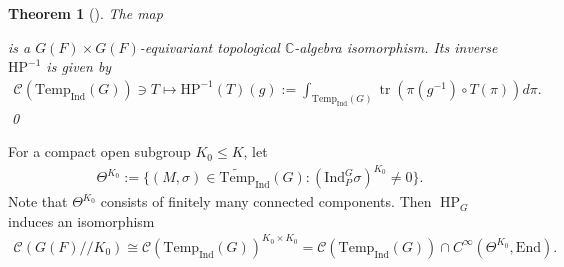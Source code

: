 \documentclass[10pt]{amsart}
\newtheorem{theorem}{Theorem}[section]
\theoremstyle{definition}
\numberwithin{equation}{section}
\DeclareMathOperator{\tr}{\mathrm{tr}}
\numberwithin{equation}{subsection}
\newcommand{\Ind}{\mathrm{Ind}}
\newcommand{\Temp}{\mathrm{Temp}}
\newcommand{\HP}{\mathop{\mathrm{HP}}\nolimits}
\begin{document}
\begin{theorem}[\cite{Waldspurger:Plancherel}]\label{HCPlan} The map 
\begin{center}
\end{center}
is a $G(F)\times G(F)$-equivariant topological $\mathbb{C}$-algebra isomorphism. Its inverse $ \mathrm{HP}^{-1}$ is given by 
\begin{align*}
    \mathcal{C}(\Temp_{\Ind}(G))\ni T\longmapsto \mathrm{HP}^{-1}(T)(g) := \int_{\Temp_{\Ind}(G)} \tr(\pi(g^{-1})\circ T(\pi)) d\pi.
\end{align*}
\qed
\end{theorem}

For a compact open subgroup $K_0\le K$, let 
\begin{align}\label{thetaK0}
    \Theta^{K_0} := \{(M,\sigma)\in\widetilde{\Temp}_\Ind(G): (\Ind_P^G\sigma)^{K_0}\neq 0\}.
\end{align}
Note that $\Theta^{K_0}$ consists of finitely many connected components. Then $\HP_G$ induces an isomorphism  
\begin{align*}\mathcal{C}(G(F)/\!/K_0) \cong \mathcal{C}(\Temp_{\Ind}(G))^{K_0\times K_0}=\mathcal{C}(\Temp_{\Ind}(G))\cap C^\infty(\Theta^{K_0},\mathrm{End}).
\end{align*}
\end{document}
